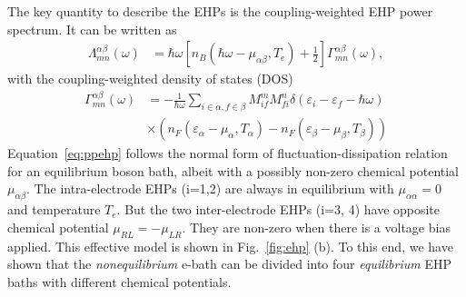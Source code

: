 \documentclass[aps
,twocolumn
,floatfix,footinbib,prl
]{revtex4-1}
\begin{document}
The key quantity to describe the EHPs is the coupling-weighted EHP power spectrum. It can be written as
\begin{align}
\Lambda_{mn}^{\alpha\beta}(\omega) &= \hbar\omega\left[n_B(\hbar\omega-\mu_{\alpha\beta},T_e)+\frac{1}{2}\right]\Gamma_{mn}^{\alpha\beta}(\omega),
\label{eq:ppehp}
\end{align}
with the coupling-weighted density of states (DOS)
\begin{align}
\Gamma_{mn}^{\alpha\beta}(\omega) &= -\frac{1}{\hbar\omega}\sum_{i\in\alpha,f\in\beta}M^{m}_{if}M^n_{fi}  \delta(\varepsilon_i-\varepsilon_f-\hbar\omega)\nonumber\\
&\times (n_F(\varepsilon_\alpha-\mu_\alpha,T_\alpha)-n_F(\varepsilon_\beta-\mu_\beta,T_\beta))%
\label{eq:gamma}
\end{align}
Equation~\ref{eq:ppehp} follows the normal form of fluctuation-dissipation relation for an equilibrium boson bath, albeit with a possibly non-zero chemical potential  $\mu_{\alpha\beta}$. The intra-electrode EHPs (i=1,2) are always in equilibrium with $\mu_{\alpha\alpha}=0$ and temperature $T_e$. But the two inter-electrode EHPs (i=3, 4) have opposite chemical potential $\mu_{RL}=-\mu_{LR}$. They are non-zero when there is a voltage bias applied. This effective model is shown in Fig.~\ref{fig:ehp} (b). To this end, we have shown that the \emph{nonequilibrium} e-bath can be divided into four \emph{equilibrium} EHP baths with different chemical potentials.
\end{document}
